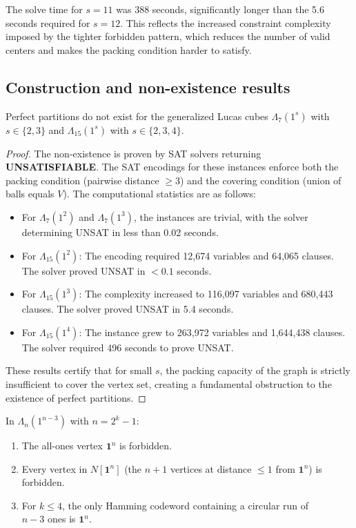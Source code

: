 The solve time for $s=11$ was 388 seconds, significantly longer than the 5.6 seconds required for $s=12$. This reflects the increased constraint complexity imposed by the tighter forbidden pattern, which reduces the number of valid centers and makes the packing condition harder to satisfy.

\subsection{Construction and non-existence results}

\begin{theorem}\label{thm:unsat-small-s}
Perfect partitions do not exist for the generalized Lucas cubes $\Lambda_7(1^s)$ with $s \in \{2, 3\}$ and $\Lambda_{15}(1^s)$ with $s \in \{2, 3, 4\}$.
\end{theorem}

\begin{proof}
The non-existence is proven by SAT solvers returning \textbf{UNSATISFIABLE}. The SAT encodings for these instances enforce both the packing condition (pairwise distance $\ge 3$) and the covering condition (union of balls equals $V$). The computational statistics are as follows:
\begin{itemize}
    \item For $\Lambda_7(1^2)$ and $\Lambda_7(1^3)$, the instances are trivial, with the solver determining UNSAT in less than 0.02 seconds.
    \item For $\Lambda_{15}(1^2)$: The encoding required 12,674 variables and 64,065 clauses. The solver proved UNSAT in $< 0.1$ seconds.
    \item For $\Lambda_{15}(1^3)$: The complexity increased to 116,097 variables and 680,443 clauses. The solver proved UNSAT in 5.4 seconds.
    \item For $\Lambda_{15}(1^4)$: The instance grew to 263,972 variables and 1,644,438 clauses. The solver required 496 seconds to prove UNSAT.
\end{itemize}
These results certify that for small $s$, the packing capacity of the graph is strictly insufficient to cover the vertex set, creating a fundamental obstruction to the existence of perfect partitions.
\end{proof}

\begin{lemma}\label{lem:forbidden}
In $\Lambda_n(1^{n-3})$ with $n = 2^k - 1$:
\begin{enumerate}
    \item The all-ones vertex $\mathbf{1}^n$ is forbidden.
    \item Every vertex in $N[\mathbf{1}^n]$ (the $n+1$ vertices at distance $\leq 1$ from $\mathbf{1}^n$) is forbidden.
    \item For $k \leq 4$, the only Hamming codeword containing a circular run of \\ $n-3$ ones is $\mathbf{1}^n$.
\end{enumerate}
\end{lemma}

